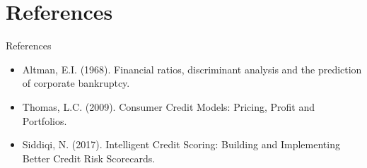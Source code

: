 \documentclass[9pt, aspectratio=169, t]{beamer}
\theoremstyle{definition}
\begin{document}
\section{References}

\begin{frame}{References}
    \begin{itemize}
        \item Altman, E.I. (1968). Financial ratios, discriminant analysis and the prediction of corporate bankruptcy.
        \item Thomas, L.C. (2009). Consumer Credit Models: Pricing, Profit and Portfolios.
        \item Siddiqi, N. (2017). Intelligent Credit Scoring: Building and Implementing Better Credit Risk Scorecards.
    \end{itemize}
\end{frame}
\end{document}
